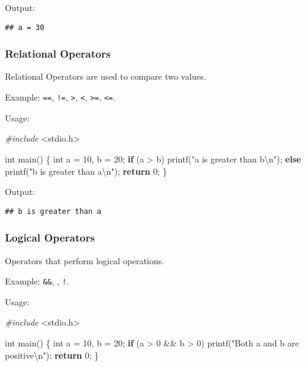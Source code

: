 \documentclass[
]{article}
\newenvironment{Shaded}{\begin{snugshade}}{\end{snugshade}}
\newcommand{\ControlFlowTok}[1]{\textcolor[rgb]{0.13,0.29,0.53}{\textbf{#1}}}
\newcommand{\DataTypeTok}[1]{\textcolor[rgb]{0.13,0.29,0.53}{#1}}
\newcommand{\DecValTok}[1]{\textcolor[rgb]{0.00,0.00,0.81}{#1}}
\newcommand{\ImportTok}[1]{#1}
\newcommand{\NormalTok}[1]{#1}
\newcommand{\PreprocessorTok}[1]{\textcolor[rgb]{0.56,0.35,0.01}{\textit{#1}}}
\newcommand{\SpecialCharTok}[1]{\textcolor[rgb]{0.00,0.00,0.00}{#1}}
\newcommand{\StringTok}[1]{\textcolor[rgb]{0.31,0.60,0.02}{#1}}
\begin{document}
Output:

\begin{verbatim}
## a = 30
\end{verbatim}

\hypertarget{relational-operators}{%
\subsubsection{Relational Operators}\label{relational-operators}}

Relational Operators are used to compare two values.

Example: \texttt{==}, \texttt{!=}, \texttt{\textgreater{}},
\texttt{\textless{}}, \texttt{\textgreater{}=}, \texttt{\textless{}=}.

Usage:

\begin{Shaded}
\begin{Highlighting}[]
\PreprocessorTok{\#include }\ImportTok{\textless{}stdio.h\textgreater{}}

\DataTypeTok{int}\NormalTok{ main() \{}
    \DataTypeTok{int}\NormalTok{ a = }\DecValTok{10}\NormalTok{, b = }\DecValTok{20}\NormalTok{;}
    \ControlFlowTok{if}\NormalTok{ (a \textgreater{} b)}
\NormalTok{        printf(}\StringTok{"a is greater than b}\SpecialCharTok{\textbackslash{}n}\StringTok{"}\NormalTok{);}
    \ControlFlowTok{else}
\NormalTok{        printf(}\StringTok{"b is greater than a}\SpecialCharTok{\textbackslash{}n}\StringTok{"}\NormalTok{);}
    \ControlFlowTok{return} \DecValTok{0}\NormalTok{;}
\NormalTok{\}}
\end{Highlighting}
\end{Shaded}

Output:

\begin{verbatim}
## b is greater than a
\end{verbatim}

\hypertarget{logical-operators}{%
\subsubsection{Logical Operators}\label{logical-operators}}

Operators that perform logical operations.

Example: \texttt{\&\&}, \texttt{\textbar{}\textbar{}}, \texttt{!}.

Usage:

\begin{Shaded}
\begin{Highlighting}[]
\PreprocessorTok{\#include }\ImportTok{\textless{}stdio.h\textgreater{}}

\DataTypeTok{int}\NormalTok{ main() \{}
    \DataTypeTok{int}\NormalTok{ a = }\DecValTok{10}\NormalTok{, b = }\DecValTok{20}\NormalTok{;}
    \ControlFlowTok{if}\NormalTok{ (a \textgreater{} }\DecValTok{0}\NormalTok{ \&\& b \textgreater{} }\DecValTok{0}\NormalTok{)}
\NormalTok{        printf(}\StringTok{"Both a and b are positive}\SpecialCharTok{\textbackslash{}n}\StringTok{"}\NormalTok{);}
    \ControlFlowTok{return} \DecValTok{0}\NormalTok{;}
\NormalTok{\}}
\end{Highlighting}
\end{Shaded}
\end{document}
